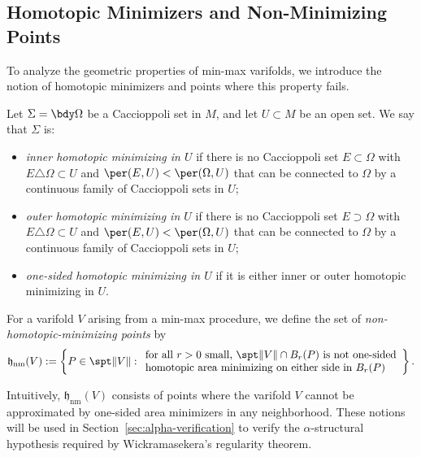\subsection{Homotopic Minimizers and Non-Minimizing Points}

To analyze the geometric properties of min-max varifolds, we introduce the notion of homotopic
minimizers and points where this property fails.

\begin{definition}\label{def:homotopic-minimizer}
Let $\Sigma = \bdy\Omega$ be a Caccioppoli set in $M$, and let $U \subset M$ be an open set. We say
that $\Sigma$ is:
\begin{itemize}
    \item \emph{inner homotopic minimizing in $U$} if there is no Caccioppoli set $E \subset \Omega$
    with $E \triangle \Omega \subset U$ and $\per(E, U) < \per(\Omega, U)$ that can be connected to
    $\Omega$ by a continuous family of Caccioppoli sets in $U$;
    \item \emph{outer homotopic minimizing in $U$} if there is no Caccioppoli set $E \supset \Omega$
    with $E \triangle \Omega \subset U$ and $\per(E, U) < \per(\Omega, U)$ that can be connected to
    $\Omega$ by a continuous family of Caccioppoli sets in $U$;
    \item \emph{one-sided homotopic minimizing in $U$} if it is either inner or outer homotopic
    minimizing in $U$.
\end{itemize}
\end{definition}

\begin{definition}\label{def:hnm}
For a varifold $V$ arising from a min-max procedure, we define the set of \emph{non-homotopic-minimizing
points} by
\[
    \mathfrak{h}_{\mathrm{nm}}(V) := \left\{P \in \spt\|V\| : \begin{array}{l}
        \text{for all $r > 0$ small, $\spt\|V\| \cap B_r(P)$ is not one-sided} \\
        \text{homotopic area minimizing on either side in $B_r(P)$}
    \end{array}\right\}.
\]
\end{definition}

Intuitively, $\mathfrak{h}_{\mathrm{nm}}(V)$ consists of points where the varifold $V$ cannot be
approximated by one-sided area minimizers in any neighborhood. These notions will be used in Section~\ref{sec:alpha-verification} to verify the $\alpha$-structural hypothesis required by Wickramasekera's regularity theorem.


